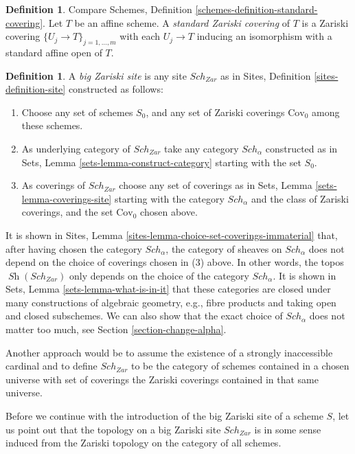\documentclass{stacks-project}
\theoremstyle{plain}
\theoremstyle{definition}
\newtheorem{definition}[subsection]{Definition}
\theoremstyle{remark}
\numberwithin{equation}{subsection}
\def\Sch{\mathit{Sch}}
\def\Sh{\mathop{\mathit{Sh}}\nolimits}
\begin{document}
\begin{definition}
\label{definition-standard-Zariski}
Compare Schemes, Definition \ref{schemes-definition-standard-covering}.
Let $T$ be an affine scheme. A {\it standard Zariski covering}
of $T$ is a Zariski covering $\{U_j \to T\}_{j = 1, \ldots, m}$
with each $U_j \to T$ inducing an isomorphism with a standard affine open
of $T$.
\end{definition}

\begin{definition}
\label{definition-big-zariski-site}
A {\it big Zariski site} is any site $\Sch_{Zar}$ as in
Sites, Definition \ref{sites-definition-site} constructed as follows:
\begin{enumerate}
\item Choose any set of schemes $S_0$, and any set of Zariski coverings
$\text{Cov}_0$ among these schemes.
\item As underlying category of $\Sch_{Zar}$
take any category $\Sch_\alpha$ constructed as in
Sets, Lemma \ref{sets-lemma-construct-category} starting with the set $S_0$.
\item As coverings of $\Sch_{Zar}$ choose any set of coverings as in
Sets, Lemma \ref{sets-lemma-coverings-site} starting with the
category $\Sch_\alpha$ and the class of Zariski coverings,
and the set $\text{Cov}_0$ chosen above.
\end{enumerate}
\end{definition}

\noindent
It is shown in Sites, Lemma \ref{sites-lemma-choice-set-coverings-immaterial}
that, after having chosen the category $\Sch_\alpha$, the
category of sheaves on $\Sch_\alpha$ does not depend on the
choice of coverings chosen in (3) above. In other words, the topos
$\Sh(\Sch_{Zar})$ only depends on the choice of
the category $\Sch_\alpha$. It is shown in
Sets, Lemma \ref{sets-lemma-what-is-in-it} that these categories
are closed under many constructions of algebraic geometry, e.g.,
fibre products and taking open and closed subschemes. We can also show
that the exact choice of $\Sch_\alpha$ does not matter
too much, see Section \ref{section-change-alpha}.

\medskip\noindent
Another approach would be to assume the existence of a
strongly inaccessible cardinal and to define $\Sch_{Zar}$
to be the category of schemes contained in a chosen universe with
set of coverings the Zariski coverings contained in that same
universe.

\medskip\noindent
Before we continue with the introduction of the big Zariski site of
a scheme $S$, let us point out that the topology on a big Zariski site
$\Sch_{Zar}$ is in some sense induced from the Zariski topology
on the category of all schemes.
\end{document}
